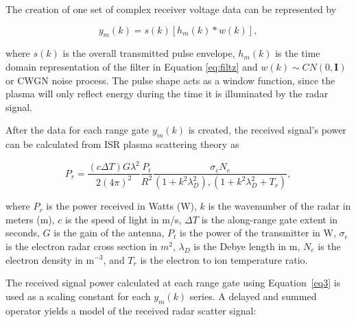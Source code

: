 The creation of one set of complex receiver voltage data can be represented by

\begin{equation}
\label{eq2}
y_m (k)= s(k)\left[h_m(k)*w(k)\right],
\end{equation}
 
\noindent where $s(k)$ is the overall transmitted pulse envelope, $h_m(k)$ is the time domain representation of the filter in Equation \ref{eq:filtz} and $w(k)\sim CN(0,\mathbf{I})$ or CWGN noise process. The pulse shape acts as a window function, since the plasma will only reflect energy during the time it is illuminated by the radar signal. 

%

After the data for each range gate $y_m(k)$ is created, the received signal's power can be calculated from ISR plasma scattering theory as 

\begin{equation}
\label{eq3}
P_r = \frac{\left(c\Delta T\right) G \lambda^2}{2(4\pi)^2}\frac{P_t }{R^2}\frac{\sigma_e N_e}{(1+k^2\lambda_D^2),(1+k^2\lambda_D^2 + T_r)},
\end{equation}
 
 \noindent where $P_r$ is the power received in Watts (W), $k$ is the wavenumber of the radar in meters (m), $c$ is the speed of light in m/s, $\Delta T$ is the along-range gate extent in seconds, $G$ is the gain of the antenna, $P_t$ is the power of the transmitter in W, $\sigma_e$ is the electron radar cross section in $m^2$,  $\lambda_D$ is the Debye length in m, $N_e$ is the electron density in m$^{-3}$, and $T_r$ is the electron to ion temperature ratio.
  
The received signal power calculated at each range gate using Equation~\ref{eq3} is used as a scaling constant for each $y_m(k)$ series.  A delayed and summed operator yields a model of the received radar scatter signal:
 
